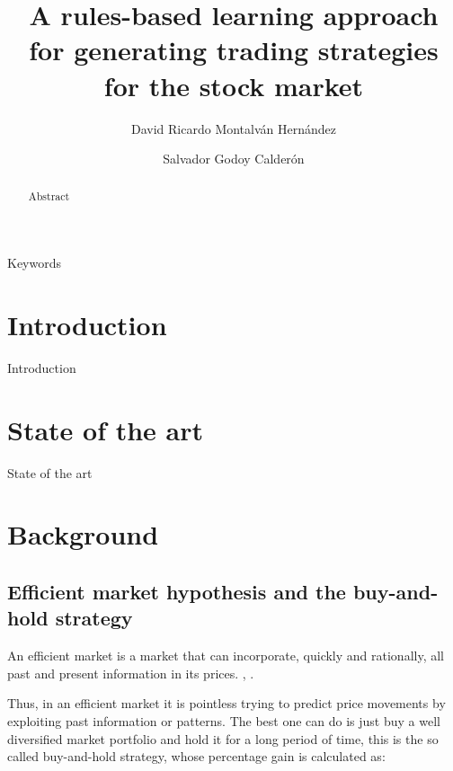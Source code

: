 \documentclass[preprint,3p,twocolumn]{elsarticle}
\begin{document}
\begin{frontmatter}
  \title{A rules-based learning approach for generating trading strategies for the stock market}
  
  \author[1]{David Ricardo Montalván Hernández }
  
  \author[1]{Salvador Godoy Calderón}
  
  \address[1]{Centro de Investigación en Computación, Instituto Politécnico Nacional,
  Av. Juan de Dios Bátiz e/ M.O. de Mendizábal s/n, Nva Ind. Vallejo, 07738, Mexico City, Mexico}
  
  
  \begin{abstract}
  Abstract
  \end{abstract}
  
  \begin{keyword}
  Keywords
  \end{keyword}
  
\end{frontmatter}

\section{Introduction}
\label{sec:introduction}
Introduction

\section{State of the art}
\label{sec:state of the art}
State of the art

\section{Background}
\label{sec:background}

\subsection{Efficient market hypothesis and the buy-and-hold strategy}
\label{subsec: efficient market}
An efficient market is a market that can incorporate, quickly and rationally, all past and present information in its prices. \cite{Fama1965}, \cite{CFA2019}.

Thus, in an efficient market it is pointless trying to predict price movements by exploiting past information or patterns. The best one can do is just buy a well diversified market portfolio and hold it for a long period of time, this is the so called buy-and-hold strategy, whose percentage gain is calculated as:
\end{document}
